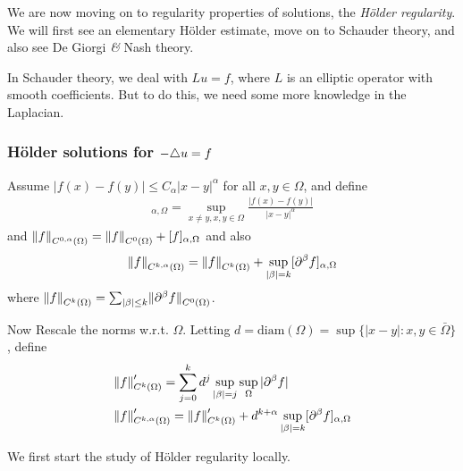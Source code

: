 \documentclass[12pt,a4paper]{article}
\begin{document}
We are now moving on to regularity properties of solutions, the \emph{H\"older regularity}. We will first see an elementary H\"older estimate, move on to Schauder theory, and also see De Giorgi \emph{\&} Nash theory.
\s

In Schauder theory, we deal with $Lu=f$, where $L$ is an elliptic operator with smooth coefficients. But to do this, we need some more knowledge in the Laplacian.
\s

\subsubsection*{H\"{o}lder solutions for $-\triangle u =f$}

 Assume $|f(x)-f(y)| \leq C_{\alpha} |x-y|^{\alpha}$ for all $x,y\in \Omega$, and define
\begin{align*}
[f]_{\alpha, \Omega} = \sup_{x\neq y, x,y\in \Omega} \frac{|f(x)-f(y)|}{|x-y|^{\alpha}}
\end{align*}
and $\snorms{f}{C^{0,\alpha}(\Omega)} = \snorms{f}{C^0(\Omega)} + [f]_{\alpha, \Omega}$ and also
\begin{align*}
\snorms{f}{C^{k,\alpha}(\Omega)} = \snorms{f}{C^k(\Omega)} + \sup_{|\beta|=k}[\pa^{\beta} f]_{\alpha, \Omega}
\end{align*}
where $\snorms{f}{C^k(\Omega)} = \sum_{|\beta|\leq k} \snorms{\pa^{\beta} f}{C^0(\Omega)}$.
\s

Now Rescale the norms w.r.t. $\Omega$. Letting $d= \text{diam}(\Omega) = \sup \{|x-y| : x,y\in \bar{\Omega}\}$, define
\begin{align*}
&\snorms{f}{C^k(\Omega)}' = \sum_{j=0}^k d^j \sup_{|\beta|=j} \sup_{\Omega} |\pa^{\beta}f| \\
&\snorms{f}{C^{k, \alpha}(\Omega)}' = \snorms{f}{C^k(\Omega)}' + d^{k+\alpha}\sup_{|\beta|=k}[\pa^{\beta}f]_{\alpha, \Omega}
\end{align*}
\s

We first start the study of H\"{o}lder regularity locally.
\s
\end{document}
